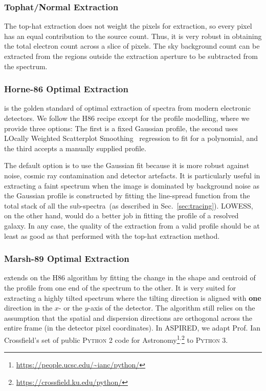 \documentclass[linenumbers, twocolumn]{aastex631}
\begin{document}
\subsubsection*{Tophat/Normal Extraction}
\label{sec:tophat}
The top-hat extraction does not weight the pixels for extraction,
so every pixel has an equal contribution to the source count. Thus,
it is very robust in obtaining the total electron count across
a slice of pixels. The sky background count can be extracted
from the regions outside the extraction aperture to be
subtracted from the spectrum.

\subsubsection*{Horne-86 Optimal Extraction}
\citet[hereafter H86]{1986PASP...98..609H} is the golden standard
of optimal extraction of spectra from modern electronic detectors.
We follow the H86 recipe except for the profile modelling,
where we provide three options: The first is a fixed Gaussian
profile, the second uses LOcally Weighted Scatterplot
Smoothing~\citep[LOWESS]{doi:10.1080/01621459.1979.10481038}
regression to fit for a polynomial, and the third accepts
a manually supplied profile.

The default option is to use the Gaussian fit because it is
more robust against noise, cosmic ray contamination and detector
artefacts. It is particularly useful in extracting a faint
spectrum when the image is dominated by background noise as the
Gaussian profile is constructed by fitting the line-spread
function from the total stack of all the
sub-spectra~(as described in Sec.~\ref{sec:tracing}).
LOWESS, on the other hand, would do a better job in fitting
the profile of a resolved galaxy. In any case, the quality
of the extraction from a valid profile should be at least as
good as that performed with the top-hat extraction method.

\subsubsection*{Marsh-89 Optimal Extraction}
\citet[hereafter M89]{1989PASP..101.1032M} extends on the H86 algorithm by
fitting the change in the shape and centroid of the profile from one end of the
spectrum to the other. It is very suited for extracting a highly tilted
spectrum where the tilting direction is aligned with \textbf{one} direction in
the $x$- or the $y$-axis of the detector. The algorithm still relies on the
assumption that the spatial and dispersion directions are orthogonal across
the entire frame (in the detector pixel coordinates). In \textsc{ASPIRED}, we
adapt Prof. Ian Crossfield's set of public \textsc{Python 2} code for
Astronomy\footnote{\url{https://people.ucsc.edu/~ianc/python/}}$^,$\footnote{\url{https://crossfield.ku.edu/python/}}
to \textsc{Python 3}.
\end{document}
